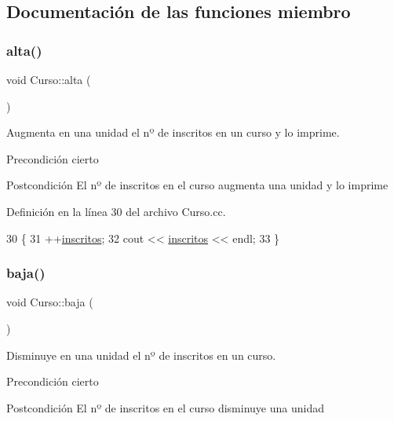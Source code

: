 \subsection{Documentación de las funciones miembro}
\mbox{\label{class_curso_a70a7c89d56e2cfea52079990808c57c3}} 
\subsubsection{\texorpdfstring{alta()}{alta()}}
{\footnotesize\ttfamily void Curso\+::alta (\begin{DoxyParamCaption}{ }\end{DoxyParamCaption})}



Augmenta en una unidad el nº de inscritos en un curso y lo imprime. 

\begin{DoxyPrecond}{Precondición}
cierto 
\end{DoxyPrecond}
\begin{DoxyPostcond}{Postcondición}
El nº de inscritos en el curso augmenta una unidad y lo imprime 
\end{DoxyPostcond}


Definición en la línea 30 del archivo Curso.\+cc.


\begin{DoxyCode}
30                        \{
31         ++\mbox{\hyperlink{class_curso_aef03f588dd91d57a6e679d05148fd971}{inscritos}};
32         cout << \mbox{\hyperlink{class_curso_aef03f588dd91d57a6e679d05148fd971}{inscritos}} << endl;
33       \}
\end{DoxyCode}
\mbox{\label{class_curso_a446950b19d03260dacc9f7d5f8e98f21}} 
\subsubsection{\texorpdfstring{baja()}{baja()}}
{\footnotesize\ttfamily void Curso\+::baja (\begin{DoxyParamCaption}{ }\end{DoxyParamCaption})}



Disminuye en una unidad el nº de inscritos en un curso. 

\begin{DoxyPrecond}{Precondición}
cierto 
\end{DoxyPrecond}
\begin{DoxyPostcond}{Postcondición}
El nº de inscritos en el curso disminuye una unidad 
\end{DoxyPostcond}


